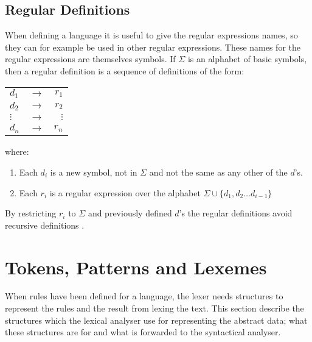 \subsection{Regular Definitions}
When defining a language it is useful to give the regular expressions names, 
so they can for example be used in other regular expressions. These names for
the regular expressions are themselves symbols. If $\Sigma$ is an alphabet of 
basic symbols, then a regular definition is a sequence of definitions of the form:
\begin{center}
\begin{tabular}{l c r}
$d_1$ & $\to$ & $r_1$\\
$d_2$ & $\to$ & $r_2$\\
$\vdots$ & $\to$ & $\vdots$\\
$d_n$ & $\to$ & $r_n$\\

\end{tabular}
\end{center}
where:
\begin{enumerate}
\item Each $d_i$ is a new symbol, not in $\Sigma$ and not the same as any other 
of the $d$'s.
\item Each $r_i$ is a regular expression over the alphabet $\Sigma  \cup \{d_1, 
d_2 \dots d_{i-1}\}$
\end{enumerate}
By restricting $r_i$ to $\Sigma$ and previously defined $d$'s the regular 
definitions avoid recursive definitions \cite{Aho2006}.

\section{Tokens, Patterns and Lexemes}
When rules have been defined for a language, the lexer needs structures to
represent the rules and the result from lexing the text. 
This section describe the structures which the lexical analyser use
for representing the abstract data; what these structures are for and what is 
forwarded to the syntactical analyser. 

